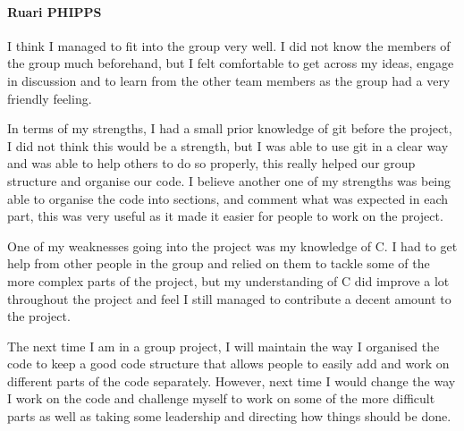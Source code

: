 \documentclass[11pt]{article}
\begin{document}
\paragraph{Ruari PHIPPS} I think I managed to fit into the group very well. I did not know the members of the group much beforehand, but I felt comfortable to get across my ideas, engage in discussion and to learn from the other team members as the group had a very friendly feeling.
\par In terms of my strengths, I had a small prior knowledge of git before the project, I did not think this would be a strength, but I was able to use git in a clear way and was able to help others to do so properly, this really helped our group structure and organise our code. I believe another one of my strengths was being able to organise the code into sections, and comment what was expected in each part, this was very useful as it made it easier for people to work on the project.
\par One of my weaknesses going into the project was my knowledge of C. I had to get help from other people in the group and relied on them to tackle some of the more complex parts of the project, but my understanding of C did improve a lot throughout the project and feel I still managed to contribute a decent amount to the project.
\par The next time I am in a group project, I will maintain the way I organised the code to keep a good code structure that allows people to easily add and work on different parts of the code separately. However, next time I would change the way I work on the code and challenge myself to work on some of the more difficult parts as well as taking some leadership and directing how things should be done.
\end{document}
